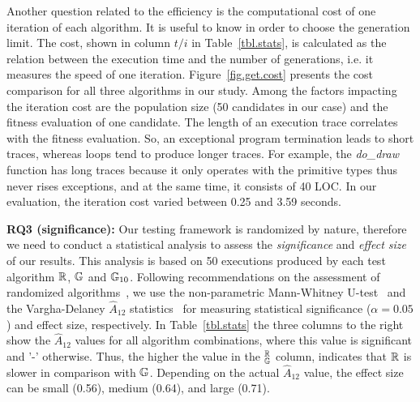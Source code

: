Another question related to the efficiency is the computational cost of one iteration of each algorithm. It is useful to know in order to choose the generation limit. The cost, shown in column $t/i$ in Table~\ref{tbl.stats}, is calculated as the relation between the execution time and the number of generations, i.e. it measures the speed of one iteration. Figure~\ref{fig.get.cost} presents the cost comparison for all three algorithms in our study. Among the factors impacting the iteration cost are the population size (50 candidates in our case) and the fitness evaluation of one candidate. The length of an execution trace correlates with the fitness evaluation. So, an exceptional program termination leads to short traces, whereas loops tend to produce longer traces. For example, the \emph{do_draw} function has long traces because it only operates with the primitive types thus never rises exceptions, and at the same time, it consists of 40 LOC. In our evaluation, the iteration cost varied between 0.25 and 3.59 seconds.\\

\textbf{RQ3 (significance):} Our testing framework is randomized by nature, therefore we need to conduct a statistical analysis to assess the \emph{significance} and \emph{effect size} of our results. This analysis is based on 50 executions produced by each test algorithm $\mathbb{R}$, $\mathbb{G}$ and $\mathbb{G}_{10}$. Following recommendations on the assessment of randomized algorithms~\cite{arcuri2011practical}, we use the non-parametric Mann-Whitney U-test~\cite{mann1947test} and the Vargha-Delaney $\hat{A}_{12}$ statistics~\cite{vargha2000critique} for measuring statistical significance ($\alpha=0.05$) and effect size, respectively. In Table~\ref{tbl.stats} the three columns to the right show the $\hat{A}_{12}$ values for all algorithm combinations, where this value is significant and '-' otherwise. Thus, the higher the value in the $_{\mathbb{G}}^{\mathbb{R}}$ column, indicates that $\mathbb{R}$ is slower in comparison with $\mathbb{G}$. Depending on the actual $\hat{A}_{12}$ value, the effect size can be small (0.56), medium (0.64), and large (0.71).\\

